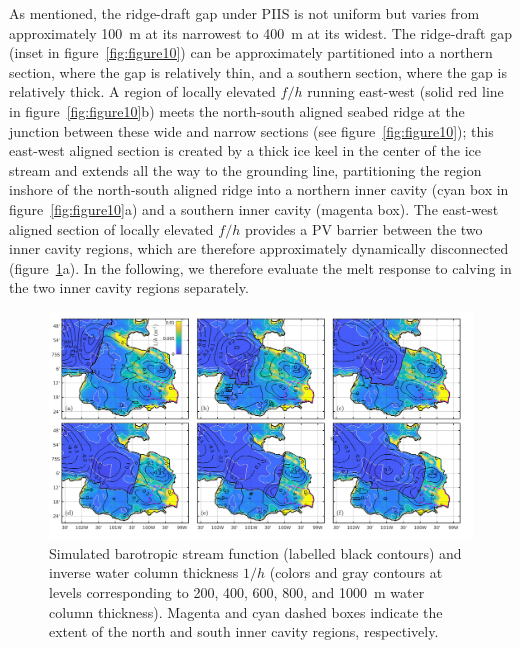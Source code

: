 \documentclass[draft]{agujournal2019}
\begin{document}
As mentioned, the ridge-draft gap under PIIS is not uniform but varies from approximately 100~m at its narrowest to 400~m at its widest.  The ridge-draft gap (inset in figure~\ref{fig:figure10}) can be approximately partitioned into a northern section, where the gap is relatively thin, and a southern section, where the gap is relatively thick. A region of locally elevated $f/h$ running east-west (solid red line in figure~\ref{fig:figure10}b) meets the north-south aligned seabed ridge at the junction between these wide and narrow sections (see figure~\ref{fig:figure10}); this east-west aligned section is created by a thick ice keel in the center of the ice stream and extends all the way to the grounding line, partitioning the region inshore of the north-south aligned ridge into a northern inner cavity (cyan box in figure~\ref{fig:figure10}a) and a southern inner cavity (magenta box). The east-west aligned section of locally elevated $f/h$  provides a PV barrier between the two inner cavity regions, which are therefore approximately dynamically disconnected (figure~\ref{fig:figure11}a). In the following, we therefore evaluate the melt response to calving in the two inner cavity regions separately.

\begin{figure}
    \centering
    \includegraphics[width = \textwidth]{../make_figures/plots/figure11.png}
    \caption{Simulated barotropic stream function (labelled black contours) and inverse water column thickness $1/h$ (colors and gray contours at levels corresponding to 200, 400, 600, 800, and 1000~m water column thickness). Magenta and cyan dashed boxes indicate the extent of the north and south inner cavity regions, respectively.}
    \label{fig:figure11}
\end{figure}
\end{document}

